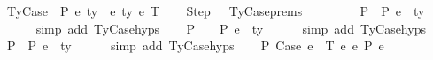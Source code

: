 \begin{isabellebody}
\ {\isacharparenleft}{\kern0pt}TyCase\ {\isasymGamma}\ P\ e{}{\isacharprime}{\kern0pt}\ ty{}{\isacharprime}{\kern0pt}\ {\isasymGamma}{}{\isacharprime}{\kern0pt}\ e{}{\isacharprime}{\kern0pt}\ ty{}{\isacharprime}{\kern0pt}\ e{}{\isacharprime}{\kern0pt}\ T{\isacharparenright}{\kern0pt}\isanewline
\isanewline
\ \ \isamarkupfalse%
\ Step\ \ {\isacharequal}{\kern0pt}\ TyCase{\isachardot}{\kern0pt}prems\ \ \ \ \ \isanewline
\isanewline
\ \ \isamarkupfalse%
\ P{}{\isacharcolon}{\kern0pt}\ {\isachardoublequoteopen}{\isasymGamma}\ {\isasymturnstile}{\isacharbraceleft}{\kern0pt}P{\isacharbraceright}{\kern0pt}\ e{}{\isacharprime}{\kern0pt}\ {\isacharcolon}{\kern0pt}\ ty{}{\isacharprime}{\kern0pt}{\isachardoublequoteclose}\isanewline
\ \ \ \ \isamarkupfalse%
\ {\isacharparenleft}{\kern0pt}simp\ add{\isacharcolon}{\kern0pt}\ TyCase{\isachardot}{\kern0pt}hyps{\isacharparenleft}{\kern0pt}{}{\isacharparenright}{\kern0pt}{\isacharparenright}{\kern0pt}\isanewline
\ \ \isamarkupfalse%
\ P{}{\isacharcolon}{\kern0pt}\ {\isachardoublequoteopen}{\isasymGamma}{}{\isacharprime}{\kern0pt}\ {\isacharat}{\kern0pt}\ {\isasymGamma}\ {\isasymturnstile}{\isacharbraceleft}{\kern0pt}P{\isacharbraceright}{\kern0pt}\ e{}{\isacharprime}{\kern0pt}\ {\isacharcolon}{\kern0pt}\ ty{}{\isacharprime}{\kern0pt}{\isachardoublequoteclose}\isanewline
\ \ \ \ \isamarkupfalse%
\ {\isacharparenleft}{\kern0pt}simp\ add{\isacharcolon}{\kern0pt}\ TyCase{\isachardot}{\kern0pt}hyps{\isacharparenleft}{\kern0pt}{}{\isacharparenright}{\kern0pt}{\isacharparenright}{\kern0pt}\isanewline
\ \ \isamarkupfalse%
\ P{}{\isacharcolon}{\kern0pt}\ {\isachardoublequoteopen}{\isasymGamma}\ {\isasymturnstile}{\isacharbraceleft}{\kern0pt}P{\isacharbraceright}{\kern0pt}\ e{}{\isacharprime}{\kern0pt}\ {\isacharcolon}{\kern0pt}\ ty{}{\isacharprime}{\kern0pt}{\isachardoublequoteclose}\isanewline
\ \ \ \ \isamarkupfalse%
\ {\isacharparenleft}{\kern0pt}simp\ add{\isacharcolon}{\kern0pt}\ TyCase{\isachardot}{\kern0pt}hyps{\isacharparenleft}{\kern0pt}{}{\isacharparenright}{\kern0pt}{\isacharparenright}{\kern0pt}\isanewline
\ \ \isamarkupfalse%
\ P{}{\isacharcolon}{\kern0pt}\ {\isachardoublequoteopen}Case\ e{}{\isacharprime}{\kern0pt}\ {\isasymGamma}{}{\isacharprime}{\kern0pt}\ T\ e{}{\isacharprime}{\kern0pt}\ e{}{\isacharprime}{\kern0pt}\ {\isacharminus}{\kern0pt}{\isachargreater}{\kern0pt}{\isacharbraceleft}{\kern0pt}P{\isacharbraceright}{\kern0pt}\ e{\isacharprime}{\kern0pt}{\isachardoublequoteclose}\isanewline

\end{isabellebody}
